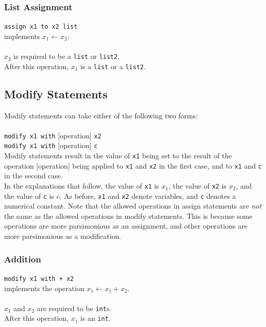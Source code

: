 \documentclass[11pt]{report}
\begin{document}
\subsubsection{List Assignment}

\texttt{assign x1 to x2 list} \\
implements $x_1 \leftarrow x_2$. \\ \\  
$x_2$ is required to be a \texttt{list} or \texttt{list2}. \\
After this operation, $x_1$ is a \texttt{list} or a \texttt{list2}.

\subsection{Modify Statements}

Modify statements can take either of the following two forms: \\ \\
\texttt{modify x1 with} [operation] \texttt{x2} \\ 
\texttt{modify x1 with} [operation] \texttt{c} \\

Modify statements result in the value of \texttt{x1} being set to the result of the operation [operation] being applied to \texttt{x1} and \texttt{x2} in the first case, and to \texttt{x1} and \texttt{c} in the second case. \\

In the explanations that follow, the value of \texttt{x1} is $x_1$, the value of \texttt{x2} is $x_2$, and the value of \texttt{c} is $c$. As before, \texttt{x1} and \texttt{x2} denote variables, and \texttt{c} denotes a numerical constant. Note that the allowed operations in assign statements are \emph{not} the same as the allowed operations in modify statements. This is because some operations are more parsimonious as an assignment, and other operations are more parsimonious as a modification.

\subsubsection{Addition}

\texttt{modify x1 with + x2} \\
implements the operation $x_1 \leftarrow x_1 + x_2$. \\ \\
$x_1$ and $x_2$ are required to be \texttt{int}s. \\
After this operation, $x_1$ is an \texttt{int}.
\end{document}
